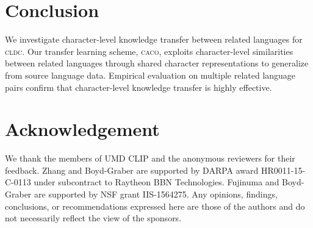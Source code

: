 \documentclass[letterpaper]{article} %
\newcommand{\abr}[1]{\textsc{#1}}
\newcommand{\name}[0]{\textsc{caco}}
\begin{document}
\section{Conclusion}\label{sec:conclusion}

We investigate character-level knowledge transfer between related languages for
\abr{cldc}.
Our transfer learning scheme, \name{}, exploits character-level similarities
between related languages through shared character representations to
generalize from source language data.
Empirical evaluation on multiple related language pairs confirm that
character-level knowledge transfer is highly effective.

\section*{Acknowledgement}
We thank the members of UMD CLIP and the anonymous reviewers for their
feedback.
Zhang and Boyd-Graber are supported by DARPA award HR0011-15-C-0113 under
subcontract to Raytheon BBN Technologies.
Fujinuma and Boyd-Graber are supported by NSF grant IIS-1564275.
Any opinions, findings, conclusions, or recommendations expressed here are
those of the authors and do not necessarily reflect the view of the sponsors.

\fontsize{9.0pt}{10.0pt}\selectfont


\end{document}
